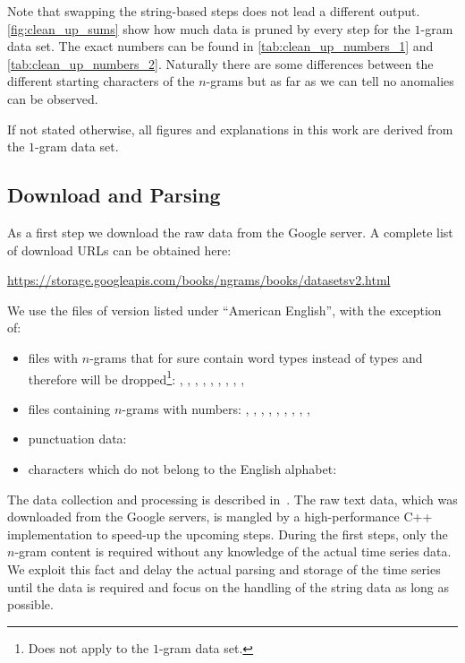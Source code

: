 Note that swapping the string-based steps does not lead a different output. \autoref{fig:clean_up_sums} show how much data is pruned by every step for the $1$-gram data set. The exact numbers can be found in \autoref{tab:clean_up_numbers_1} and \autoref{tab:clean_up_numbers_2}. Naturally there are some differences between the different starting characters of the $n$-grams but as far as we can tell no anomalies can be observed.

If not stated otherwise, all figures and explanations in this work are derived from the $1$-gram data set.


\subsection{Download and Parsing}
\label{ssec:baseline:data:download}
As a first step we download the raw data from the Google server. A complete list of download URLs can be obtained here:

\url{https://storage.googleapis.com/books/ngrams/books/datasetsv2.html}

We use the files of version  listed under \enquote{American English}, with the exception of:

\begin{itemize}
    \item files with $n$-grams that for sure contain word types instead of types and therefore will be dropped\footnote{Does not apply to the $1$-gram data set.}: , , , , , , , , , 
    \item files containing $n$-grams with numbers: , , , , , , , , , 
    \item punctuation data: 
    \item characters which do not belong to the English alphabet: 
\end{itemize}

The data collection and processing is described in~\cite{Google_nGrams}. The raw text data, which was downloaded from the Google servers, is mangled by a high-performance C++ implementation to speed-up the upcoming steps. During the first steps, only the $n$-gram content is required without any knowledge of the actual time series data. We exploit this fact and delay the actual parsing and storage of the time series until the data is required and focus on the handling of the string data as long as possible.


